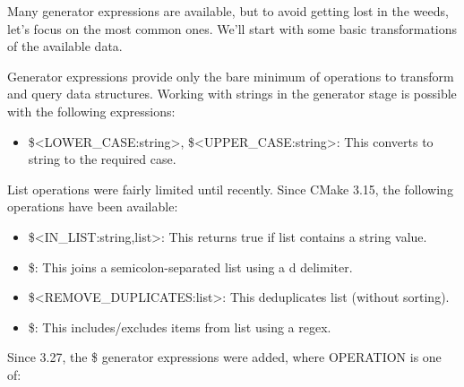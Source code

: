 
Many generator expressions are available, but to avoid getting lost in the weeds, let’s focus on the most common ones. We’ll start with some basic transformations of the available data.


Generator expressions provide only the bare minimum of operations to transform and query data structures. Working with strings in the generator stage is possible with the following expressions:

\begin{itemize}
\item
\$<LOWER\_CASE:string>, \$<UPPER\_CASE:string>: This converts to string to the required case.
\end{itemize}

List operations were fairly limited until recently. Since CMake 3.15, the following operations have been available:

\begin{itemize}
\item
\$<IN\_LIST:string,list>: This returns true if list contains a string value.

\item
\$<JOIN:list,d>: This joins a semicolon-separated list using a d delimiter.

\item
\$<REMOVE\_DUPLICATES:list>: This deduplicates list (without sorting).

\item
\$<FILTER:list,INCLUDE|EXCLUDE,regex>: This includes/excludes items from list using a regex.
\end{itemize}

Since 3.27, the \$<LIST:OPERATION> generator expressions were added, where OPERATION is one of:

